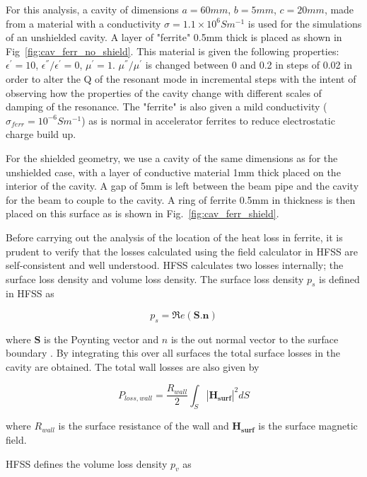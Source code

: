 For this analysis, a cavity of dimensions $a=60mm$, $b=5mm$, $c=20mm$, made from a material with a conductivity $\sigma = 1.1 \times 10^{6} S m^{-1}$ is used for the simulations of an unshielded cavity. A layer of "ferrite" 0.5mm thick is placed as shown in Fig~\ref{fig:cav_ferr_no_shield}. This material is given the following properties: $\epsilon^{'} = 10$, $\epsilon^{''}/\epsilon^{'} = 0$, $\mu^{'}=1$. $\mu^{''}/ \mu^{'}$ is changed between 0 and 0.2 in steps of 0.02 in order to alter the Q of the resonant mode in incremental steps with the intent of observing how the properties of the cavity change with different scales of damping of the resonance. The "ferrite" is also given a mild conductivity ($\sigma_{ferr} = 10^{-6} S m^{-1}$) as is normal in accelerator ferrites to reduce electrostatic charge build up. 

For the shielded geometry, we use a cavity of the same dimensions as for the unshielded case, with a layer of conductive material 1mm thick placed on the interior of the cavity. A gap of 5mm is left between the beam pipe and the cavity for the beam to couple to the cavity. A ring of ferrite 0.5mm in thickness is then placed on this surface as is shown in Fig.~\ref{fig:cav_ferr_shield}.

Before carrying out the analysis of the location of the heat loss in ferrite, it is prudent to verify that the losses calculated using the field calculator in HFSS are self-consistent and well understood. HFSS calculates two losses internally; the surface loss density and volume loss density. The surface loss density $p_{s}$ is defined in HFSS as

\begin{equation}
p_{s} = \Re{}e \left( \mathbf{S}.\mathbf{n} \right)
\end{equation}

where $\mathbf{S}$ is the Poynting vector and $n$ is the out normal vector to the surface boundary \cite{hfss}. By integrating this over all surfaces the total surface losses in the cavity are obtained. The total wall losses are also given by 

\begin{equation}
P_{loss, wall} = \frac{R_{wall}}{2} \int_{S} \left| \mathbf{H_{surf}} \right|^{2} dS
\label{eqn:wall_losses}
\end{equation}

where $R_{wall}$ is the surface resistance of the wall and $\mathbf{H_{surf}}$ is the surface magnetic field.

HFSS defines the volume loss density $p_{v}$ as 

